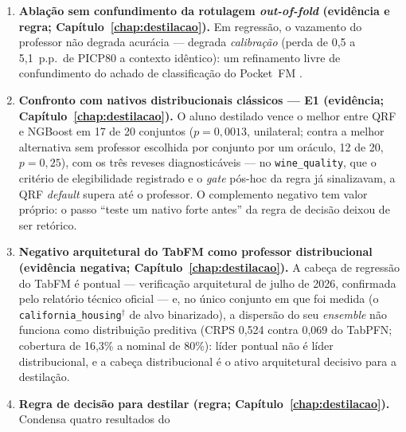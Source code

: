 \begin{enumerate}
\begin{enumerate}
    sistema distribucional CRPS-ótimo abaixo da
    configuração competitiva mais barata dele ($2{,}5\times$ e
    $27\times$ a latência do aluno nos dois casos medidos --- o E1
    mostra que uma QRF nativa também habita o regime); onde um
    professor de um único membro já alcança o \emph{tier} de latência
    do aluno, reduzir o \emph{ensemble} basta. Dois achados colaterais de
    engenharia: um membro do TabPFN $\approx$ oito a um sétimo da
    latência, e a última duplicação de contexto é desproporcionalmente
    cara em GPUs de 16~GB.
  \item \textbf{Ablação sem confundimento da rotulagem \emph{out-of-fold}
    (evidência e regra; Capítulo~\ref{chap:destilacao}).} Em regressão, o
    vazamento do professor não degrada acurácia --- degrada
    \emph{calibração} (perda de 0,5 a 5,1~p.p.\ de PICP80 a contexto
    idêntico): um refinamento livre de confundimento do achado de classificação
    do Pocket~FM \citep{pocketfm2026}.
  \item \textbf{Confronto com nativos distribucionais clássicos --- E1
    (evidência; Capítulo~\ref{chap:destilacao}).} O aluno destilado vence o
    melhor entre QRF e NGBoost em 17
    de 20 conjuntos ($p=0{,}0013$, unilateral; contra a melhor
    alternativa sem professor escolhida por conjunto por um oráculo,
    12 de 20, $p=0{,}25$), com os três reveses diagnosticáveis
    --- no \texttt{wine\_quality}, que o critério de elegibilidade
    registrado e o \emph{gate} pós-hoc da regra já sinalizavam, a QRF
    \emph{default} supera até o
    professor. O complemento negativo tem valor próprio: o passo ``teste
    um nativo forte antes'' da regra de decisão deixou de ser retórico.
  \item \textbf{Negativo arquitetural do TabFM como professor
    distribucional (evidência negativa;
    Capítulo~\ref{chap:destilacao}).} A cabeça de regressão do TabFM é
    pontual --- verificação arquitetural de julho de 2026, confirmada
    pelo relatório técnico oficial \citep{kong2026} --- e, no único
    conjunto em que foi medida (o
    \texttt{california\_housing}$^\dagger$ de alvo binarizado), a
    dispersão do seu \emph{ensemble} não funciona como distribuição
    preditiva (CRPS 0,524 contra 0,069 do TabPFN; cobertura de 16,3\%
    a nominal de 80\%):
    líder pontual não é líder distribucional, e a
    cabeça distribucional é o ativo arquitetural decisivo para a
    destilação.
  \item \textbf{Regra de decisão para destilar (regra;
    Capítulo~\ref{chap:destilacao}).} Condensa quatro resultados do

\end{enumerate}
\end{enumerate}
